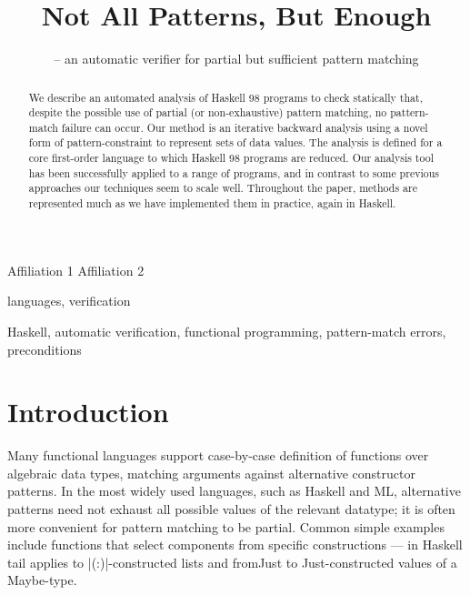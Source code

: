 \documentclass[preprint]{sigplanconf}
\newcommand{\C}[1]{\textsf{#1}}
\newcommand{\anon}[2]{#2}
\begin{document}
\copyrightdata{[to be supplied]}

\titlebanner{} %
\preprintfooter{}   %

\title{Not All Patterns, But Enough}
\subtitle{ -- an automatic verifier for partial but sufficient pattern matching}

\authorinfo{\anon{Neil Mitchell}{Author 1}}
           {\anon{University of York, UK - ndm}{Affiliation 1}}
           {}
\authorinfo{\anon{Colin Runciman}{Author 2}}
           {\anon{University of York, UK - colin}{Affiliation 2}}
           {}

\maketitle

\begin{abstract}
We describe an automated analysis of Haskell 98 programs to check
statically that, despite the possible use of partial (or non-exhaustive)
pattern matching, no pattern-match failure can occur.  Our method is an
iterative backward analysis using a novel form of pattern-constraint
to represent sets of data values.  The analysis is defined for a
core first-order language to which Haskell 98 programs are reduced.
Our analysis tool has been successfully applied to a range of programs,
and in contrast to some previous approaches our techniques seem to
scale well.  Throughout the paper, methods are represented much as we
have implemented them in practice, again in Haskell.
\end{abstract}


\terms
languages, verification

\keywords
Haskell, automatic verification, functional programming, pattern-match errors, preconditions

\section{Introduction}
\label{sec:introduction}

Many functional languages support case-by-case definition of functions
over algebraic data types, matching arguments against alternative
constructor patterns.  In the most widely used languages, such as Haskell
and ML, alternative patterns need not exhaust all possible values of
the relevant datatype; it is often more convenient for pattern matching
to be partial.  Common simple examples include functions that select
components from specific constructions --- in Haskell \C{tail} applies
to |(:)|-constructed lists and \C{fromJust} to \C{Just}-constructed values of
a \C{Maybe}-type.
\end{document}
